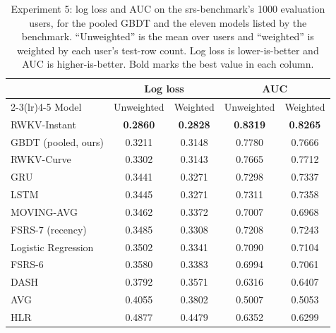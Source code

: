 \begin{table}[htbp]
  \centering
  \caption[Experiment 5: srs-benchmark comparison]{Experiment 5: log loss and AUC on the srs-benchmark's 1000 evaluation users, for the
    pooled GBDT and the eleven models listed by the benchmark. ``Unweighted'' is the mean over users and ``weighted'' is
    weighted by each user's test-row count. Log loss is lower-is-better and AUC is higher-is-better. Bold marks the best value
    in each column.}
  \label{tab:exp5-srsb}
  \begin{tabular}{@{}lcccc@{}}
    \toprule
    & \multicolumn{2}{c}{Log loss} & \multicolumn{2}{c}{AUC} \\
    \cmidrule(lr){2-3}\cmidrule(lr){4-5}
    Model & Unweighted & Weighted & Unweighted & Weighted \\
    \midrule
    RWKV-Instant & \textbf{0.2860} & \textbf{0.2828} & \textbf{0.8319} & \textbf{0.8265} \\
    GBDT (pooled, ours) & 0.3211 & 0.3148 & 0.7780 & 0.7666 \\
    RWKV-Curve & 0.3302 & 0.3143 & 0.7665 & 0.7712 \\
    GRU & 0.3441 & 0.3271 & 0.7298 & 0.7337 \\
    LSTM & 0.3445 & 0.3271 & 0.7311 & 0.7358 \\
    MOVING-AVG & 0.3462 & 0.3372 & 0.7007 & 0.6968 \\
    FSRS-7 (recency) & 0.3485 & 0.3308 & 0.7208 & 0.7243 \\
    Logistic Regression & 0.3502 & 0.3341 & 0.7090 & 0.7104 \\
    FSRS-6 & 0.3580 & 0.3383 & 0.6994 & 0.7061 \\
    DASH & 0.3792 & 0.3571 & 0.6316 & 0.6407 \\
    AVG & 0.4055 & 0.3802 & 0.5007 & 0.5053 \\
    HLR & 0.4877 & 0.4479 & 0.6352 & 0.6299 \\
    \bottomrule
  \end{tabular}
\end{table}

